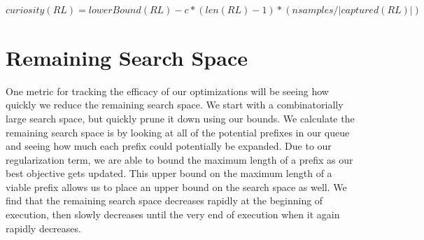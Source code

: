 \begin{math}
curiosity(RL) = lowerBound(RL) - c * (len(RL) - 1)  * (nsamples / |captured(RL)|)
\end{math}

\section{Remaining Search Space}
One metric for tracking the efficacy of our optimizations will be seeing how quickly we reduce the remaining search space.
We start with a combinatorially large search space, but quickly prune it down using our bounds.
We calculate the remaining search space is by looking at all of the potential prefixes in our  queue and seeing how much each prefix could potentially be expanded.
Due to our regularization term, we are able to bound the maximum length of a prefix as our best objective gets updated.
This upper bound on the maximum length of a viable prefix allows us to place an upper bound on the search space as well.
We find that the remaining search space decreases rapidly at the beginning of execution, then slowly decreases until the very end of execution when it again rapidly decreases.